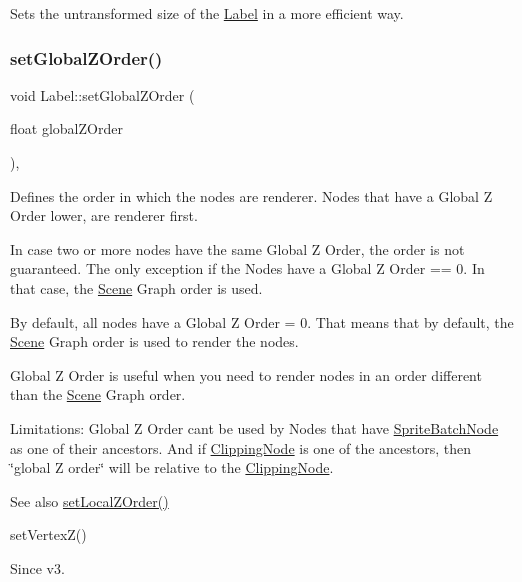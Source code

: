 Sets the untransformed size of the \hyperlink{classLabel}{Label} in a more efficient way. \mbox{\label{classLabel_a0c53017f28f3e1f2c65f3ea7693a69b2}} 
\subsubsection{\texorpdfstring{set\+Global\+Z\+Order()}{setGlobalZOrder()}\hspace{0.1cm}{\footnotesize\ttfamily [1/2]}}
{\footnotesize\ttfamily void Label\+::set\+Global\+Z\+Order (\begin{DoxyParamCaption}\item[{float}]{global\+Z\+Order }\end{DoxyParamCaption})\hspace{0.3cm}{\ttfamily [override]}, {\ttfamily [virtual]}}

Defines the order in which the nodes are renderer. Nodes that have a Global Z Order lower, are renderer first.

In case two or more nodes have the same Global Z Order, the order is not guaranteed. The only exception if the Nodes have a Global Z Order == 0. In that case, the \hyperlink{classScene}{Scene} Graph order is used.

By default, all nodes have a Global Z Order = 0. That means that by default, the \hyperlink{classScene}{Scene} Graph order is used to render the nodes.

Global Z Order is useful when you need to render nodes in an order different than the \hyperlink{classScene}{Scene} Graph order.

Limitations\+: Global Z Order can\textquotesingle{}t be used by Nodes that have \hyperlink{classSpriteBatchNode}{Sprite\+Batch\+Node} as one of their ancestors. And if \hyperlink{classClippingNode}{Clipping\+Node} is one of the ancestors, then \char`\"{}global Z order\char`\"{} will be relative to the \hyperlink{classClippingNode}{Clipping\+Node}.

\begin{DoxySeeAlso}{See also}
{\ttfamily \hyperlink{classNode_aee4e616c2d55b722226aae1e68b4946f}{set\+Local\+Z\+Order()}} 

{\ttfamily set\+Vertex\+Z()}
\end{DoxySeeAlso}
\begin{DoxySince}{Since}
v3.
\end{DoxySince}

